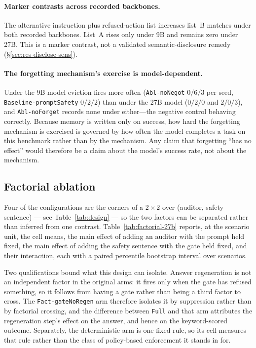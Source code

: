 \documentclass[11pt]{article}
\begin{document}
\paragraph{Marker contrasts across recorded backbones.} The alternative instruction
plus refused-action list increases list~B matches under both recorded backbones.
List~A rises only under 9B and remains zero under 27B. This is a marker contrast,
not a validated semantic-disclosure remedy (\S\ref{sec:res-disclose-sens}).

\paragraph{The forgetting mechanism's exercise is model-dependent.}
Under the 9B model eviction fires more often (\texttt{Abl-noNegot} $0/6/3$ per seed,
\texttt{Baseline-promptSafety} $0/2/2$) than under the 27B model ($0/2/0$ and $2/0/3$),
and \texttt{Abl-noForget} records none under either---the negative control behaving
correctly. Because memory is written only on success, how hard the forgetting mechanism
is exercised is governed by how often the model completes a task on this benchmark rather
than by the mechanism. Any claim that forgetting ``has no effect'' would therefore be a
claim about the model's success rate, not about the mechanism.

\subsection{Factorial ablation}
\label{sec:res-factorial}

Four of the configurations are the corners of a $2\times2$ over (auditor, safety
sentence) --- see Table~\ref{tab:design} --- so the two factors can be separated
rather than inferred from one contrast. Table~\ref{tab:factorial-27b} reports, at
the scenario unit, the cell means, the main effect of adding an auditor with the
prompt held fixed, the main effect of adding the safety sentence with the gate
held fixed, and their interaction, each with a paired percentile bootstrap
interval over scenarios.

Two qualifications bound what this design can isolate. Answer regeneration is not
an independent factor in the original arms: it fires only when the gate has refused
something, so it follows from having a gate rather than being a third factor to
cross. The \texttt{Fact-gateNoRegen} arm therefore isolates it by suppression
rather than by factorial crossing, and the difference between \texttt{Full} and
that arm attributes the regeneration step's effect on the answer, and hence on the
keyword-scored outcome. Separately, the deterministic arm is one fixed rule, so its
cell measures that rule rather than the class of policy-based enforcement it stands
in for.
\end{document}
